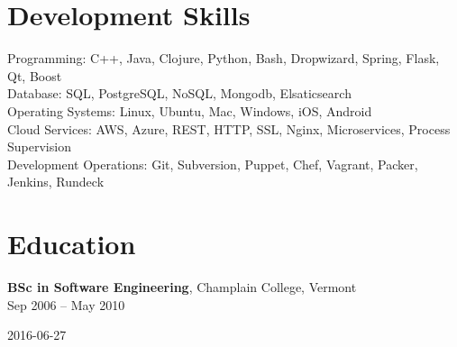 \documentclass{article}
\newenvironment{bottompar}{\par\vspace*{\fill}}{\clearpage}
\begin{document}
\section*{Development Skills}
Programming: C++, Java, Clojure, Python, Bash, Dropwizard, Spring, Flask, Qt, Boost\\
Database: SQL, PostgreSQL, NoSQL, Mongodb, Elsaticsearch\\
Operating Systems: Linux, Ubuntu, Mac, Windows, iOS, Android\\
Cloud Services: AWS, Azure, REST, HTTP, SSL, Nginx, Microservices, Process Supervision\\
Development Operations: Git, Subversion, Puppet, Chef, Vagrant, Packer, Jenkins, Rundeck\\


\section*{Education}
{\bf BSc in Software Engineering}, Champlain College, Vermont\\
Sep 2006 -- May 2010


\begin{bottompar}
\begin{center}
{\small 2016-06-27}
\end{center}
\end{bottompar}
\end{document}
